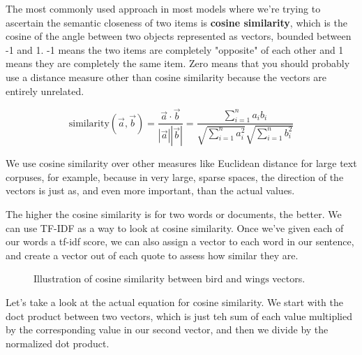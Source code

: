 \documentclass[11pt, table]{diazessay} %
\begin{document}
\begin{sloppypar}
The most commonly used approach in most models where we're trying to ascertain the semantic closeness of two items is \textbf{cosine similarity}, which is the cosine of the angle between two objects represented as vectors, bounded between -1 and 1. -1 means the two items are completely "opposite" of each other and 1 means they are completely the same item. Zero means that you should probably use a distance measure other than cosine similarity because the vectors are entirely unrelated. 


\begin{equation}
\mathrm{similarity}(\vec{a}, \vec{b}) = \frac{\vec{a} \cdot \vec{b}}{|\vec{a}| |\vec{b}|} = \frac{\sum\limits_{i=1}^{n} a_i b_i}{\sqrt{\sum\limits_{i=1}^{n} a_i^2} \sqrt{\sum\limits_{i=1}^{n} b_i^2}}
\end{equation}

We use cosine similarity over other measures like Euclidean distance for large text corpuses, for example, because in very large, sparse spaces, the direction of the vectors is just as, and even more important, than the actual values. 

The higher the cosine similarity is for two words or documents, the better. We can use TF-IDF as a  way to look at cosine similarity. Once we've given each of our words a tf-idf score, we can also assign a vector to each word in our sentence, and create a vector out of each quote to assess how similar they are. 


\begin{figure}[h]
    \centering
    \caption{Illustration of cosine similarity between $\text{bird}$ and $\text{wings}$ vectors.}
    \label{fig:cosine-similarity}
\end{figure}

Let's take a look at the actual equation for cosine similarity. We start with the doct product between two vectors, which is just teh sum of each value multiplied by the corresponding value in our second vector, and then we divide by the normalized dot product. 


\end{sloppypar}
\end{document}
